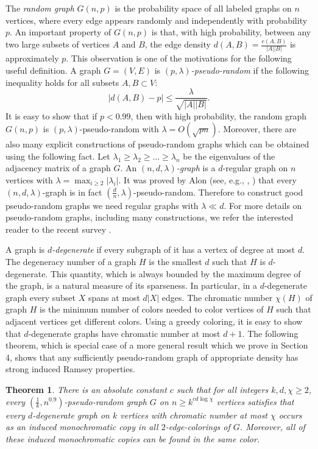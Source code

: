 \documentclass[11pt]{article}
\newtheorem{theorem}{Theorem}[section]
\begin{document}
The {\it random graph}
$G(n,p)$ is the probability space of all labeled graphs on $n$ vertices, where
every edge appears randomly and independently with probability $p$. An
important property of $G(n,p)$ is that, with high
probability, between any two large subsets of vertices $A$ and $B$, the edge
density $d(A,B)=\frac{e(A,B)}{|A||B|}$ is approximately $p$. This observation is one of the motivations for the following useful
definition. A graph $G=(V,E)$ is {\it $(p,\lambda)$-pseudo-random}
if the following inequality holds for all subsets $A,B \subset V$:
$$|d(A,B)-p| \leq \frac{\lambda}{\sqrt{|A||B|}}.$$
It is easy to show that if $p<0.99$, then with high probability, the
random graph $G(n,p)$ is $(p,\lambda)$-pseudo-random with
$\lambda=O(\sqrt{pn})$. Moreover, there are also many explicit
constructions of pseudo-random graphs which can be obtained using
the following fact. Let $\lambda_1 \geq \lambda_2 \geq \ldots \geq
\lambda_n$ be the eigenvalues of the adjacency matrix of a graph
$G$. An {\it $(n,d,\lambda)$-graph} is a $d$-regular graph on $n$
vertices with $\lambda = \max_{i \geq 2} |\lambda_i|$. It was proved
by Alon (see, e.g., \cite{AlSp}, \cite{KrSu}) that every
$(n,d,\lambda)$-graph is in fact
$(\frac{d}{n},\lambda)$-pseudo-random. Therefore to construct good
pseudo-random graphs we need regular graphs with $\lambda \ll d$.
For more details on pseudo-random graphs, including many
constructions, we refer the interested reader to the recent survey
\cite{KrSu}.

A graph is {\it $d$-degenerate} if every subgraph of it has a vertex
of degree at most $d$. The degeneracy number of a graph $H$ is the
smallest $d$ such that $H$ is $d$-degenerate. This quantity, which
is always bounded by the maximum degree of the graph, is a natural
measure of its sparseness. In particular, in a $d$-degenerate graph
every subset $X$ spans at most $d|X|$ edges. The chromatic number
$\chi(H)$ of graph $H$ is the minimum number of colors needed to
color vertices of $H$ such that adjacent vertices get different
colors. Using a greedy coloring, it is easy to show that
$d$-degenerate graphs have chromatic number at most $d+1$. The
following theorem, which is special case of a more general result
which we prove in Section 4, shows that any sufficiently
pseudo-random graph of appropriate density has strong induced Ramsey
properties.

\begin{theorem}\label{quasicor1}
There is an absolute constant $c$ such that for all integers $k,d,\chi \geq
2$, every $(\frac{1}{k},n^{0.9})$-pseudo-random graph $G$ on $n \geq
k^{cd\log \chi}$ vertices satisfies that every $d$-degenerate graph on
$k$ vertices with chromatic number at most $\chi$ occurs as an
induced monochromatic copy in all $2$-edge-colorings of $G$.
Moreover, all of these induced monochromatic copies can be found in
the same color.
\end{theorem}
\end{document}
